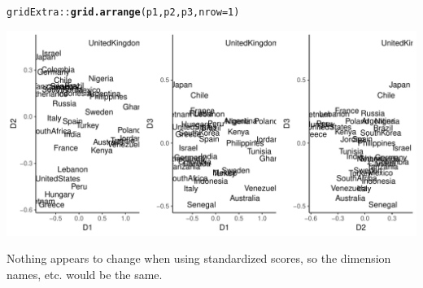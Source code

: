 \documentclass{article}\usepackage[]{graphicx}\usepackage[]{color}
\makeatletter
\def\maxwidth{ %
  \ifdim\Gin@nat@width>\linewidth
    \linewidth
  \else
    \Gin@nat@width
  \fi
}
\newcommand{\hlnum}[1]{\textcolor[rgb]{0.686,0.059,0.569}{#1}}%
\newcommand{\hlopt}[1]{\textcolor[rgb]{0,0,0}{#1}}%
\newcommand{\hlstd}[1]{\textcolor[rgb]{0.345,0.345,0.345}{#1}}%
\newcommand{\hlkwc}[1]{\textcolor[rgb]{0.333,0.667,0.333}{#1}}%
\newcommand{\hlkwd}[1]{\textcolor[rgb]{0.737,0.353,0.396}{\textbf{#1}}}%
\newenvironment{kframe}{%
 \def\at@end@of@kframe{}%
 \ifinner\ifhmode%
  \def\at@end@of@kframe{\end{minipage}}%
  \begin{minipage}{\columnwidth}%
 \fi\fi%
 \def\FrameCommand##1{\hskip\@totalleftmargin \hskip-\fboxsep
 \colorbox{shadecolor}{##1}\hskip-\fboxsep
     \hskip-\linewidth \hskip-\@totalleftmargin \hskip\columnwidth}%
 \MakeFramed {\advance\hsize-\width
   \@totalleftmargin\z@ \linewidth\hsize
   \@setminipage}}%
 {\par\unskip\endMakeFramed%
 \at@end@of@kframe}
\newenvironment{knitrout}{}{} %
\makeatother
\begin{document}
\begin{knitrout}
\begin{kframe}
\begin{alltt}
\hlstd{gridExtra}\hlopt{::}\hlkwd{grid.arrange}\hlstd{(p1, p2, p3,} \hlkwc{nrow} \hlstd{=} \hlnum{1}\hlstd{)}
\end{alltt}
\end{kframe}
\includegraphics[width=\maxwidth]{figure/unnamed-chunk-14-4} 

\end{knitrout}

Nothing appears to change when using standardized scores, so the dimension names, etc. would be the same.
\end{document}
